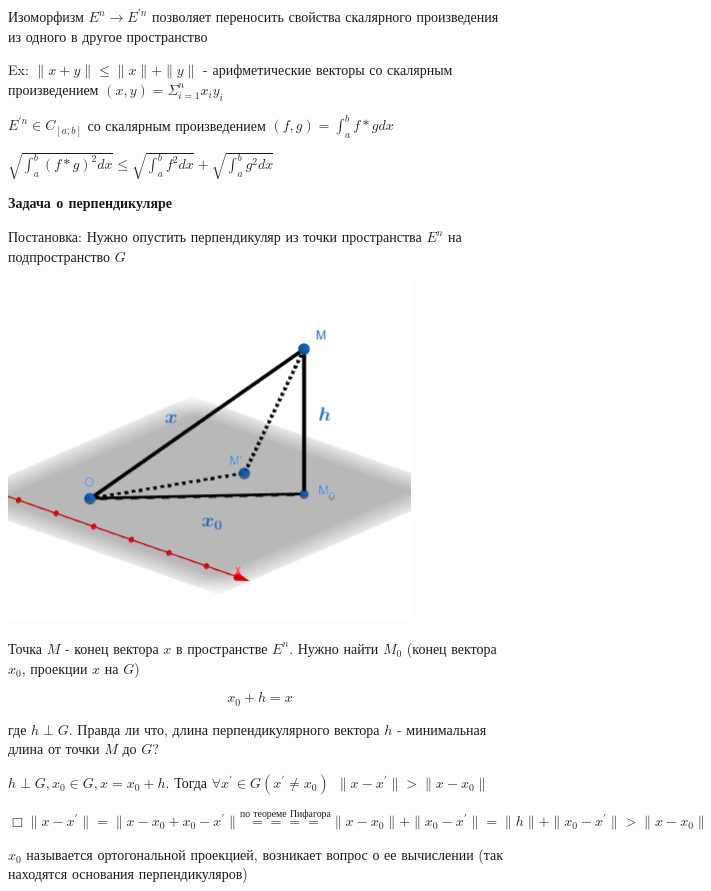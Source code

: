 \documentclass[12pt]{article}
\begin{document}
    \Nota Изоморфизм $E^n \rightarrow E^{\prime n}$ позволяет переносить свойства скалярного произведения
    из одного в другое пространство

    Ex: $\|x + y\| \leq \|x\| + \|y\|$ - арифметические векторы со скалярным произведением $(x, y) = \Sigma^n_{i=1} x_i y_i$

    $E^{\prime n} \in C_{[a;b]}$ со скалярным произведением $\displaystyle (f, g) = \int^b_a f * g dx$

    $\displaystyle \sqrt{\int^b_a (f * g)^2 dx} \leq \sqrt{\int^b_a f^2 dx} + \sqrt{\int^b_a g^2 dx}$

    \textbf{Задача о перпендикуляре}

    Постановка: Нужно опустить перпендикуляр из точки пространства $E^n$ на подпространство $G$

    \includegraphics[height=90mm]{images/specsec_2024_03_01_1}

    Точка $M$ - конец вектора $x$ в пространстве $E^n$.
    Нужно найти $M_0$ (конец вектора $x_0$, проекции $x$ на $G$)

    \[x_0 + h = x\]

    где $h \perp G$. Правда ли что, длина перпендикулярного вектора $h$ - минимальная длина от точки $M$ до $G$?

    \Th $h \perp G, x_0 \in G, x = x_0 + h$. Тогда $\forall x^\prime \in G (x^\prime \neq x_0) \ \ \|x - x^\prime\| > \|x - x_0\|$

    $\Box \|x - x^\prime\| = \|x - x_0 + x_0 - x^\prime\| \stackrel{\text{по теореме Пифагора}}{====} \|x - x_0\| + \|x_0 - x^\prime\| = \|h\| + \|x_0 - x^\prime\| > \|x - x_0\|$

    \Nota $x_0$ называется ортогональной проекцией, возникает вопрос о ее вычислении (так находятся основания перпендикуляров)
\end{document}
